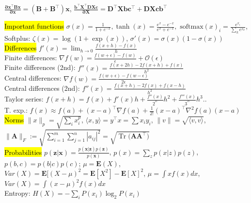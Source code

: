 \documentclass[11pt,landscape]{article}
\DeclareMathOperator{\Tr}{Tr}
\begin{document}
\begin{multicols*}{3}
{\begin{minipage}{\linewidth}
$ \mathbf{\frac{\partial x^\top B x}{\partial x} = (B+B^\top)x}$, 
$\mathbf{\frac{b^\top X^\top D X c}{\partial X} = D^\top X b c^\top +DXcb^\top}$
\end{minipage}}
\hl{Important functions} 
$\sigma(x)=\frac{1}{1+e^{-x}}, \tanh(x)=\frac{e^x-e^{-x}}{e^x+e^{-x}}, \text{ softmax}(x)_i=\frac{e^{x_i}}{\sum_ke^{x_k}}$, Softplus: $\zeta(x)=\log(1+\exp(x))$, 
$\sigma'(x) = \sigma(x)(1-\sigma(x))$\\
\hl{Differences}
$f'(x)=\lim_{h\rightarrow 0}\frac{f(x+h)-f(x)}{h}$\\
Finite differences: 
$\nabla f(w) = \frac{f(w+\epsilon)-f(w)}{\epsilon}+\mathcal{O}(\epsilon)$ \\
Finite differences (2nd): 
$f''(x) = \frac{f(x+2h)-2f(x+h)+f(x)}{h^2}$\\
Central differences: 
$\nabla f(w) = \frac{f(w+\epsilon)-f(w-\epsilon)}{2\epsilon}$\\
Central differences (2nd): 
$f''(x) = \frac{f(x+h)-2f(x)+f(x-h)}{h^2}$\\
Taylor series: 
$f(x+h)=f(x)+f'(x)h+\frac{f''(x)}{2^^21}h^2+\frac{f'''(x)}{3^^21}h^3..$ \\
T. exp.:
$f(x)\approx f(a)+(x-a)^\top\nabla f(a)+\frac{1}{2\text{!}}(x-a)^\top \nabla^2 f(a)(x-a)$\\
\hl{Norms} 
$\|x\|_p=\sqrt{\sum_i x_i^p}$, 
$\langle x, y \rangle = y^\top x = \sum x_i y_i$, 
$\|v\|=\sqrt{\langle v, v \rangle}$, 
$\|\mathbf{A}\|_F:=\sqrt{\sum_{i=1}^m\sum_{j=1}^n|a_{ij}|^2}
=\sqrt{\Tr{(\mathbf{AA^\top)}}}$\\
\hl{Probabilities} 
$p(\mathbf{z}|\mathbf{x})=\frac{p(\mathbf{x}|\mathbf{z})p(\mathbf{z})}{p(\mathbf{x})}$, 
$p(x)=\sum_z p(x|z)p(z)$, $p(b,c)=p(b|c)p(c)$; 
$\mu=\mathbf{E}(X)$, 
$Var(X)= \mathbf{E}[(X-\mu)^2=\mathbf{E}[X^2]-\mathbf{E}[X]^2$, 
$\mu = \int x f(x)dx$, 
$Var(X)=\int (x-\mu)^2f(x) dx$\\
%
Entropy: $H(X)=-\sum_i P(x_i) \log_2 P(x_i)$\\
%
%
\end{multicols*}
\end{document}
